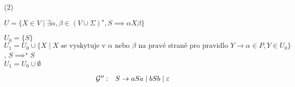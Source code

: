 (2) 


$U = \{X \in V \mid \exists \alpha, \beta \in (V \cup \Sigma)^\star, S \implies \alpha X \beta \}$

$U_0 = \{S\}$\\
$U_1 = U_0 \cup \{X \mid X \text{ se vyskytuje v }\alpha \text{ nebo } \beta \text{ na pravé straně pro pravidlo } 
Y \rightarrow \alpha \in P, Y \in U_0\}$, $S \implies ^\star S$\\
$U_1 = U_0 \cup {\emptyset}$

\[
    \begin{array}{l l}
        \mathcal{G''}: & S \rightarrow  aSa \mid bSb \mid \varepsilon \\
    \end{array}
\]

